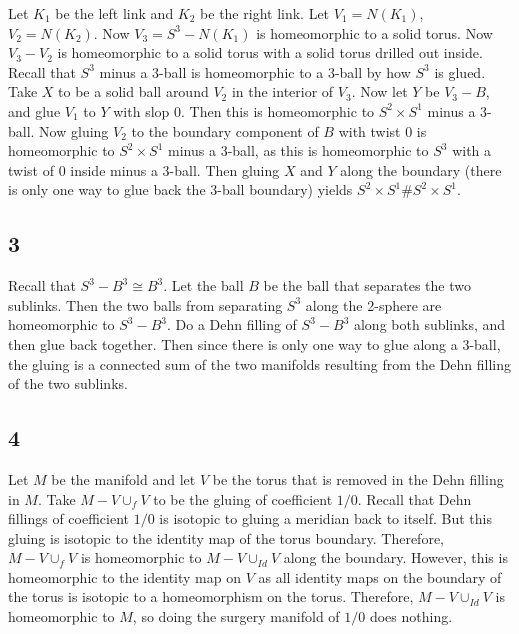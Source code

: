 \documentclass{article}
\theoremstyle{definition}
\numberwithin{theorem}{section}
\numberwithin{equation}{section}
\begin{document}
Let $K_1$ be the left link and $K_2$ be the right link. Let $V_1 = N(K_1)$, $V_2 = N(K_2)$. Now $V_3 = S^3 - N(K_1)$ is homeomorphic to a solid torus. Now $V_3 - V_2$ is homeomorphic to a solid torus with a solid torus drilled out inside. Recall that $S^3$ minus a 3-ball is homeomorphic to a 3-ball by how $S^3$ is glued. Take $X$ to be a solid ball around $V_2$ in the interior of $V_3$. Now let $Y$ be $V_3 - B$, and glue $V_1$ to $Y$ with slop $0$. Then this is homeomorphic to $S^2 \times S^1$ minus a $3$-ball. Now gluing $V_2$ to the boundary component of $B$ with twist 0 is homeomorphic to $S^2 \times S^1$ minus a $3$-ball, as this is homeomorphic to $S^3$ with a twist of $0$ inside minus a $3$-ball. Then gluing $X$ and $Y$ along the boundary (there is only one way to glue back the 3-ball boundary) yields $S^2 \times S^1 \# S^2 \times S^1$. 

\subsection{3}
Recall that $S^3 - B^3 \cong B^3$. Let the ball $B$ be the ball that separates the two sublinks. Then the two balls from separating $S^3$ along the 2-sphere are homeomorphic to $S^3 - B^3$. Do a Dehn filling of $S^3 - B^3$ along both sublinks, and then glue back together. Then since there is only one way to glue along a 3-ball, the gluing is a connected sum of the two manifolds resulting from the Dehn filling of the two sublinks. 

\subsection{4}
Let $M$ be the manifold and let $V$ be the torus that is removed in the Dehn filling in $M$. Take $M - V \cup_f V$ to be the gluing of coefficient $1/0$. 
Recall that Dehn fillings of coefficient $1/0$ is isotopic to gluing a meridian back to itself. But this gluing is isotopic to the identity map of the torus boundary. Therefore, $M - V \cup_f V$ is homeomorphic to $M - V \cup_{Id} V$ along the boundary. However, this is homeomorphic to the identity map on $V$ as all identity maps on the boundary of the torus is isotopic to a homeomorphism on the torus. Therefore, $M - V \cup_{Id} V$ is homeomorphic to $M$, so doing the surgery manifold of $1/0$ does nothing. 
\end{document}
